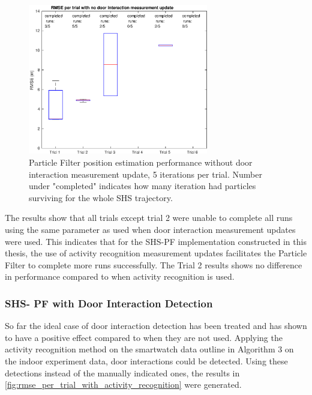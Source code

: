  \begin{figure}[H]
 	\centering
 	\includegraphics[width=0.7\textwidth]{images/20201201_1847_RMSE_per_trial_with_no_door_interaction_measurement_update}
 	\caption[Particle Filter position estimation performance without door interaction]{Particle Filter position estimation performance without door interaction measurement update, 5 iterations per trial. Number under "completed" indicates how many iteration had particles surviving for the whole \ac{SHS} trajectory.}
 	\label{fig:pf_boxplot_no_doors}
 \end{figure}
 
 The results show that all trials except trial 2 were unable to complete all runs using the same parameter as used when door interaction measurement updates were used. This indicates that for the SHS-PF implementation constructed in this thesis, the use of activity recognition measurement updates facilitates the Particle Filter to complete more runs successfully.  The Trial 2 results shows no difference in performance compared to when activity recognition is used. \par 
 
 

\subsubsection{SHS- PF with Door Interaction Detection}
So far the ideal case of door interaction detection has been treated and has shown to have a positive effect compared to when they are not used. Applying the activity recognition method on the smartwatch data outline in Algorithm 3 on the indoor experiment data, door interactions could be detected. Using these detections instead of the manually indicated ones, the results in \cref{fig:rmse_per_trial_with_activity_recognition} were generated.

